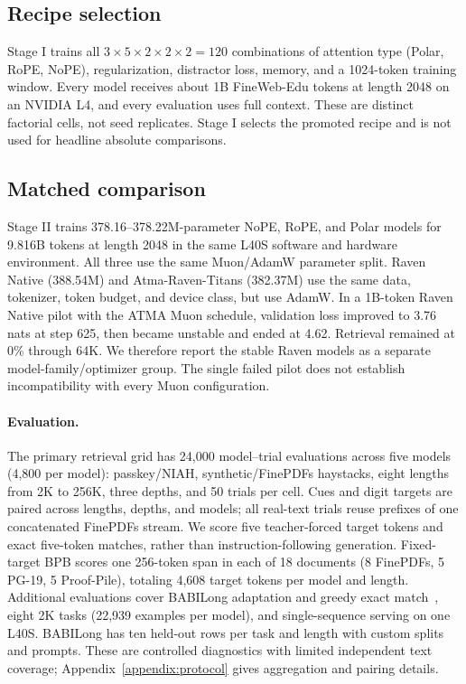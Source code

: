 \documentclass{article}
\begin{document}
\subsection{Recipe selection}
Stage I trains all $3\times5\times2\times2\times2=120$ combinations of attention type (Polar, RoPE, NoPE), regularization, distractor loss, memory, and a 1024-token training window. Every model receives about 1B FineWeb-Edu tokens at length 2048 on an NVIDIA L4, and every evaluation uses full context. These are distinct factorial cells, not seed replicates. Stage I selects the promoted recipe and is not used for headline absolute comparisons.

\subsection{Matched comparison}
Stage II trains 378.16--378.22M-parameter NoPE, RoPE, and Polar models for 9.816B tokens at length 2048 in the same L40S software and hardware environment. All three use the same Muon/AdamW parameter split. Raven Native (388.54M) and Atma-Raven-Titans (382.37M) use the same data, tokenizer, token budget, and device class, but use AdamW. In a 1B-token Raven Native pilot with the ATMA Muon schedule, validation loss improved to 3.76 nats at step 625, then became unstable and ended at 4.62. Retrieval remained at 0\% through 64K. We therefore report the stable Raven models as a separate model-family/optimizer group. The single failed pilot does not establish incompatibility with every Muon configuration.

\paragraph{Evaluation.}
The primary retrieval grid has 24,000 model--trial evaluations across five models (4,800 per model): passkey/NIAH, synthetic/FinePDFs haystacks, eight lengths from 2K to 256K, three depths, and 50 trials per cell. Cues and digit targets are paired across lengths, depths, and models; all real-text trials reuse prefixes of one concatenated FinePDFs stream. We score five teacher-forced target tokens and exact five-token matches, rather than instruction-following generation. Fixed-target BPB scores one 256-token span in each of 18 documents (8 FinePDFs, 5 PG-19, 5 Proof-Pile), totaling 4,608 target tokens per model and length. Additional evaluations cover BABILong adaptation and greedy exact match~\citep{babilong2024}, eight 2K tasks (22,939 examples per model), and single-sequence serving on one L40S. BABILong has ten held-out rows per task and length with custom splits and prompts. These are controlled diagnostics with limited independent text coverage; Appendix~\ref{appendix:protocol} gives aggregation and pairing details.
\end{document}
